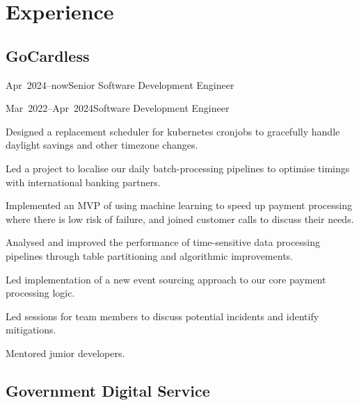 \documentclass[a4paper]{barrucadu-cv}
\newcommand{\range}[2]{#1–#2}
\newcommand{\orange}[1]{\range{#1}{now}}
\begin{document}
\section{Experience}

\subsection{GoCardless}
\begin{cventry}{\orange{Apr~2024}}{Senior Software Development Engineer}
\end{cventry}

\begin{cventry}{\range{Mar~2022}{Apr~2024}}{Software Development Engineer}
  \begin{tightitemize}
  \item Designed a replacement scheduler for kubernetes cronjobs to gracefully handle daylight savings and other timezone changes.
  \item Led a project to localise our daily batch-processing pipelines to optimise timings with international banking partners.
  \item Implemented an MVP of using machine learning to speed up payment processing where there is low risk of failure, and joined customer calls to discuss their needs.
  \item Analysed and improved the performance of time-sensitive data processing pipelines through table partitioning and algorithmic improvements.
  \item Led implementation of a new event sourcing approach to our core payment processing logic.
  \item Led sessions for team members to discuss potential incidents and identify mitigations.
  \item Mentored junior developers.
  \end{tightitemize}
\end{cventry}

\subsection{Government Digital Service}
\end{document}
